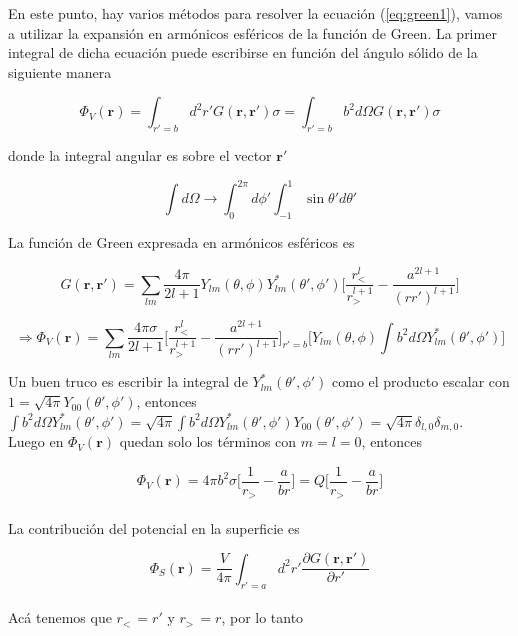 En este punto, hay varios m\'etodos para resolver la ecuaci\'on (\ref{eq:green1}), vamos a utilizar la expansi\'on en arm\'onicos esf\'ericos de la funci\'on de Green. La primer integral de dicha ecuaci\'on puede escribirse en funci\'on del \'angulo s\'olido de la siguiente manera

$$ \Phi_{V}(\mathbf{r}) = \int_{r' = b}d^{2}r'G(\mathbf{r}, \mathbf{r}')\sigma = \int_{r' = b}b^{2}d\Omega G(\mathbf{r}, \mathbf{r}')\sigma$$

donde la integral angular es sobre el vector $\mathbf{r}'$

$$\int d\Omega \rightarrow \int_{0}^{2\pi} d\phi' \int_{-1}^{1}\sin \theta' d\theta'$$

La funci\'on de Green expresada en arm\'onicos esf\'ericos es

\begin{equation}
    \label{eq:green3}
    G(\mathbf{r}, \mathbf{r}') = \sum_{lm} \frac{4\pi}{2l + 1}Y_{lm}(\theta, \phi)Y_{lm}^{*}(\theta', \phi')\bigg[ \frac{r^{l}_{<~}}{r^{l+1}_{>~}} - \frac{a^{2l + 1}}{(rr')^{l+1}}\bigg]
\end{equation}

$$\Rightarrow \Phi_{V}(\mathbf{r}) = \sum_{lm} \frac{4\pi \sigma}{2l + 1}\bigg[ \frac{r^{l}_{<~}}{r^{l+1}_{>~}} - \frac{a^{2l + 1}}{(rr')^{l+1}}\bigg]_{r' = b}\bigg[Y_{lm}(\theta, \phi)\int b^{2}d\Omega Y_{lm}^{*}(\theta', \phi')\bigg]$$

Un buen truco es escribir la integral de $Y_{lm}^{*}(\theta', \phi')$ como el producto escalar con $1 = \sqrt{4\pi}Y_{00}(\theta', \phi')$, entonces $\int b^{2}d\Omega Y_{lm}^{*}(\theta', \phi') = \sqrt{4\pi}\int b^{2}d\Omega Y_{lm}^{*}(\theta', \phi')Y_{00}(\theta', \phi') = \sqrt{4\pi}\delta_{l, 0}\delta_{m, 0}$.\\

Luego en $\Phi_{V}(\mathbf{r})$ quedan solo los t\'erminos con $m = l = 0$, entonces

$$\Phi_{V}(\mathbf{r}) = 4\pi b ^{2}\sigma\bigg[ \frac{1}{r_{>~}} - \frac{a}{br}\bigg] = Q\bigg[ \frac{1}{r_{>~}} - \frac{a}{br}\bigg]$$\\

La contribuci\'on del potencial en la superficie es

$$ \Phi_{S}(\mathbf{r}) = \frac{V}{4\pi}\int_{r' = a}d^{2}r'\frac{\partial G(\mathbf{r}, \mathbf{r}')}{\partial r'}$$\\

Ac\'a tenemos que $r_{<~} = r'$ y $r_{>~} = r$, por lo tanto

